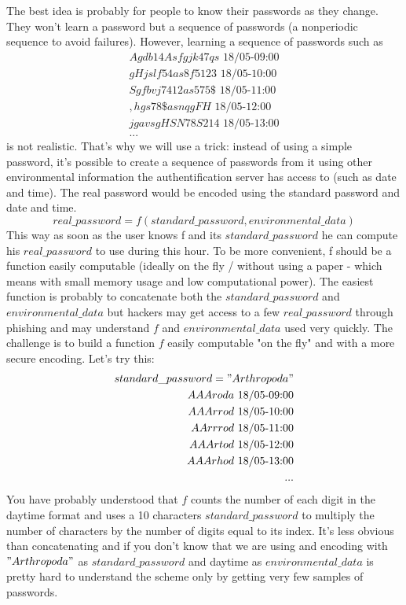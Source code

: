\documentclass[11pt]{article}
\begin{document}
The best idea is probably for people to know their passwords as they change. They won't learn a password but a sequence of passwords (a nonperiodic sequence to avoid failures). However, learning a sequence of passwords such as
\begin{equation}
\begin{split}
Agdb14Asfgjk47qs\mbox{ 18/05-09:00}\\
gHjslf54as8f5123\mbox{ 18/05-10:00}\\
Sgfbvj7412as575\$\mbox{ 18/05-11:00}\\
,hgs78\$asnqgFH\mbox{ 18/05-12:00}\\
jgavsgHSN78S214\mbox{ 18/05-13:00}\\
...
\end{split}
\end{equation}
is not realistic. That's why we will use a trick: instead of using a simple password, it's possible to create a sequence of passwords from it using other environmental information the authentification server has access to (such as date and time). The real password would be encoded using the standard password and date and time.
$$ real\_password = f(standard\_password,environmental\_data)$$
This way as soon as the user knows f and its $standard\_password$ he can compute his $real\_password$ to use during this hour. To be more convenient, f should be a function easily computable (ideally on the fly / without using a paper - which means with small memory usage and low computational power).
The easiest function is probably to concatenate both the $standard\_password$ and $environmental\_data$ but hackers may get access to a few $real\_password$ through phishing and may understand $f$ and $environmental\_data$ used very quickly.
The challenge is to build a function $f$ easily computable "on the fly" and with a more secure encoding. Let's try this:\\
\begin{equation}
\begin{split}
\mbox{$standard\_password="Arthropoda"$}\\
AAAroda\mbox{ 18/05-09:00}\\
AAArrod\mbox{ 18/05-10:00}\\
AArrrod\mbox{ 18/05-11:00}\\
AAArtod\mbox{ 18/05-12:00}\\
AAArhod\mbox{ 18/05-13:00}\\
...
\end{split}
\end{equation}
You have probably understood that $f$ counts the number of each digit in the daytime format and uses a 10 characters $standard\_password$ to multiply the number of characters by the number of digits equal to its index. It's less obvious than concatenating and if you don't know that we are using and encoding with $"Arthropoda"$ as $standard\_password$ and daytime as $environmental\_data$ is pretty hard to understand the scheme only by getting very few samples of passwords.
\end{document}

